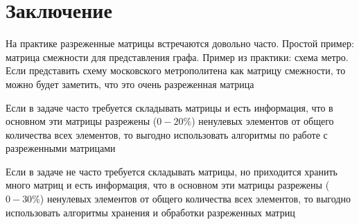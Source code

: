 \section*{Заключение}

На практике разреженные матрицы встречаются довольно часто. Простой пример: матрица смежности для представления графа. Пример из практики: схема метро. Если представить схему московского метрополитена как матрицу смежности, то можно будет заметить, что это очень разреженная матрица

Если в задаче часто требуется складывать матрицы и есть информация, что в основном эти матрицы разрежены ($0-20\%$) ненулевых элементов от общего количества всех элементов, то выгодно использовать алгоритмы по работе с разреженными матрицами

Если в задаче не часто требуется складывать матрицы, но приходится хранить много матриц и есть информация, что в основном эти матрицы разрежены ($0-30\%$) ненулевых элементов от общего количества всех элементов, то выгодно использовать алгоритмы хранения и обработки разреженных матриц
